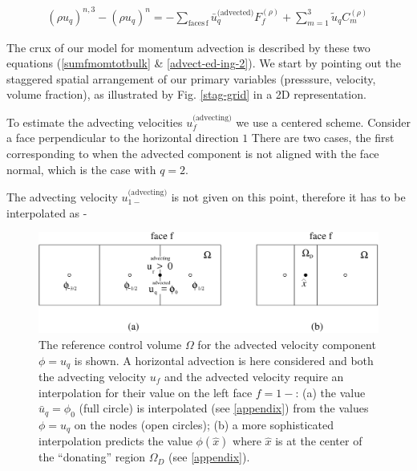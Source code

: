 

\begin{align}
	{(\rho u_q)^{n,3} - (\rho u_q)^{n}} =  - \sum_{\textrm{faces} \, \textrm{f}}  \bar u_{q}^{\textrm{(advected)}}  
F^{(\rho)}_{f} + \sum_{m=1}^3 \tilde u_q C_m^{(\rho)} \, 
\label{advect-ed-ing-2}
\end{align}


The crux of our model for momentum advection is described 
by these two equations (\eqref{sumfmomtotbulk} \& \eqref{advect-ed-ing-2}).
We start by pointing out the staggered spatial arrangement of our
primary variables (presssure, velocity, volume fraction), 
as illustrated by Fig. \ref{stag-grid} in a 2D representation.  


To estimate the advecting velocities $u_f^{\textrm{(advecting)}}$ we use a centered scheme.
Consider a face perpendicular to the horizontal direction $1$
There are two cases, the first corresponding to when 
the advected component is not aligned with the 
face normal, which is the case with $q=2$. 


The advecting velocity  $u_{1-}^{\textrm{(advecting)}}$ 
is not given on this point, therefore it has to be interpolated as - 


\begin{figure}
\begin{center}
    \includegraphics[width=\textwidth]{plots/advect-ed-ing.pdf}
\end{center}
\caption{The reference control volume $\Omega$ for the advected velocity component 
$\phi=u_q$ is shown. A horizontal advection is here considered and both the advecting velocity 
$u_f$ and the advected velocity require an interpolation for their value on the left face 
$f=1-$: (a) the value $\bar u_q = \phi_0$ (full circle) is interpolated 
(see \ref{appendix}) from the values $\phi=u_q$ on the nodes (open circles);
(b) a more sophisticated interpolation predicts the value $\phi(\hat x)$ where $\hat x$ is
at the center of the ``donating'' region $\Omega_D$ (see \ref{appendix}).}
\label{advect-ed-ing-fig}
\end{figure}





